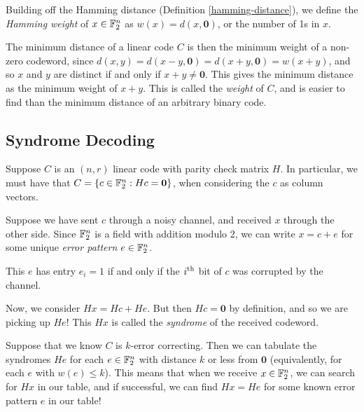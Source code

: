 \documentclass{article}
\begin{document}
\begin{definition}
	\label{hamming-weight}
    Building off the Hamming distance (Definition \ref{hamming-distance}), we define the \textit{Hamming weight} of $x \in \mathbb{F}_2^n$ as $w(x) = d(x, \mathbf{0})$, or the number of 1s in $x$.
\end{definition}

\begin{corollary}
    The minimum distance of a linear code $C$ is then the minimum weight of a non-zero codeword, since $d(x, y) = d(x-y, \mathbf{0}) = d(x + y, \mathbf{0}) = w(x+y)$, and so $x$ and $y$ are distinct if and only if $x + y \neq \mathbf{0}$. This gives the minimum distance as the minimum weight of $x + y$. This is called the \textit{weight} of $C$, and is easier to find than the minimum distance of an arbitrary binary code.
\end{corollary}


\subsection{Syndrome Decoding}
\label{section-algebraic-syndrome-decoding}

Suppose $C$ is an $(n, r)$ linear code with parity check matrix $H$.
In particular, we must have that $C = \left\lbrace c \in \mathbb{F}_2^n : Hc = \mathbf{0} \right\rbrace$, when considering the $c$ as column vectors.

Suppose we have sent $c$ through a noisy channel, and received $x$ through the other side.
Since $\mathbb{F}_2^n$ is a field with addition modulo 2, we can write $x = c + e$ for some unique \textit{error pattern} $e \in \mathbb{F}_2^n$.

\begin{note}
	This $e$ has entry $e_i = 1$ if and only if the $i^{\text{th}}$ bit of $c$ was corrupted by the channel.
\end{note}

Now, we consider $Hx = Hc + He$.
But then $Hc = \mathbf{0}$ by definition, and so we are picking up $He$!
This $Hx$ is called the \textit{syndrome} of the received codeword.

Suppose that we know $C$ is $k$-error correcting.
Then we can tabulate the syndromes $He$ for each $e \in \mathbb{F}_2^n$ with distance $k$ or less from $\mathbf{0}$ (equivalently, for each $e$ with $w(e) \leq k$).
This means that when we receive $x \in \mathbb{F}_2^n$, we can search for $Hx$ in our table, and if successful, we can find $Hx = He$ for some known error pattern $e$ in our table!
\end{document}
